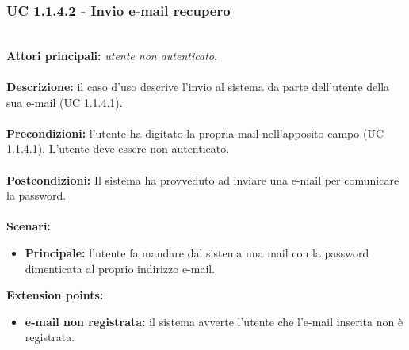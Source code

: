 \documentclass[a4paper,11pt]{article}
\begin{document}
\vspace{6 mm}

\subsubsection{UC 1.1.4.2 - Invio e-mail recupero}
\ \\
\textbf{Attori principali:} \textit{utente non autenticato}.\\
\\
\textbf{Descrizione:} il caso d'uso descrive l'invio al sistema da parte dell'utente della sua e-mail (UC 1.1.4.1).\\
\\
\textbf{Precondizioni:} l'utente ha digitato la propria mail nell'apposito campo (UC 1.1.4.1). L'utente deve essere non autenticato.\\
\\
\textbf{Postcondizioni:} Il sistema ha provveduto ad inviare una e-mail per comunicare la password. \\
\\
\textbf{Scenari:}
\begin{itemize}
\item \textbf{Principale:} l'utente fa mandare dal sistema una mail con la password dimenticata al proprio indirizzo e-mail.
\end{itemize}
\textbf{Extension points:}
\begin{itemize}
\item \textbf{e-mail non registrata:} il sistema avverte l'utente che l'e-mail inserita non è registrata.
\end{itemize}
\ \\
\end{document}
